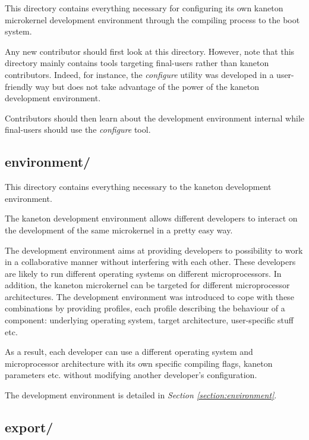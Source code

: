 This directory contains everything necessary for configuring its own
kaneton microkernel development environment through the compiling process
to the boot system.

Any new contributor should first look at this directory. However, note that
this directory mainly contains tools targeting final-users rather than
kaneton contributors. Indeed, for instance, the \textit{configure} utility
was developed in a user-friendly way but does not take advantage of the
power of the kaneton development environment.

Contributors should then learn about the development environment internal
while final-users should use the \textit{configure} tool.

%
%

\subsection*{environment/}

This directory contains everything necessary to the kaneton development
environment.

The kaneton development environment allows different developers to
interact on the development of the same microkernel in a pretty easy way.

The development environment aims at providing developers to possibility to
work in a collaborative manner without interfering with each other. These
developers are likely to run different operating systems on different
microprocessors. In addition, the kaneton microkernel can be targeted for
different microprocessor architectures. The development environment was
introduced to cope with these combinations by providing profiles, each
profile describing the behaviour of a component: underlying operating system,
target architecture, user-specific stuff etc.

As a result, each developer can use a different operating system and
microprocessor architecture with its own specific compiling flags, kaneton
parameters etc. without modifying another developer's configuration.

The development environment is detailed in \textit{Section
\ref{section:environment}}.

%
%

\subsection*{export/}

